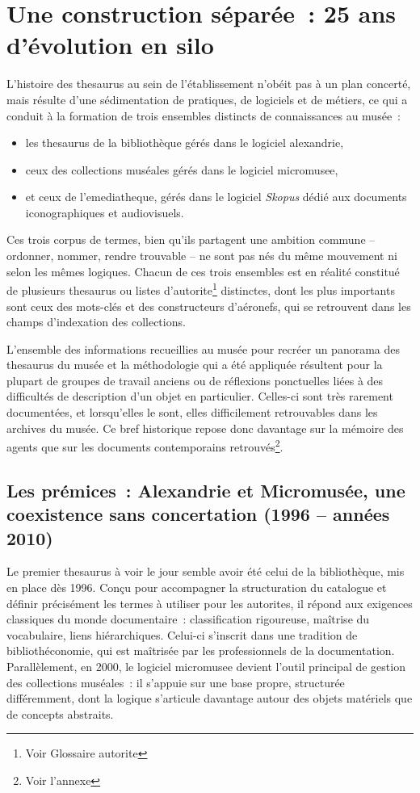 \section{\label{II-A-1}Une construction séparée~: 25 ans d'évolution en silo}

L'histoire des \gls{thesaurus} au sein de l'établissement n'obéit pas à un plan concerté, mais résulte d'une sédimentation de pratiques, de logiciels et de métiers, ce qui a conduit à la formation de trois ensembles distincts de connaissances au musée~: 
\begin{itemize}
	\item les \gls{thesaurus} de la bibliothèque gérés dans le logiciel \gls{alexandrie},
	\item ceux des collections muséales gérés dans le logiciel \gls{micromusee},
	\item et ceux de l'\gls{emediatheque}, gérés dans le logiciel \textit{Skopus} dédié aux documents iconographiques et audiovisuels.
\end{itemize}
Ces trois corpus de termes, bien qu'ils partagent une ambition commune – ordonner, nommer, rendre trouvable – ne sont pas nés du même mouvement ni selon les mêmes logiques. Chacun de ces trois ensembles est en réalité constitué de plusieurs \gls{thesaurus} ou listes d'\gls{autorite}\footnote{Voir Glossaire \gls{autorite}} distinctes, dont les plus importants sont ceux des mots-clés et des constructeurs d'aéronefs, qui se retrouvent dans les champs d'indexation des collections.

L'ensemble des informations recueillies au musée pour recréer un panorama des \gls{thesaurus} du musée et la méthodologie qui a été appliquée résultent pour la plupart de groupes de travail anciens ou de réflexions ponctuelles liées à des difficultés de description d'un objet en particulier. Celles-ci sont très rarement documentées, et lorsqu'elles le sont, elles difficilement retrouvables dans les archives du musée. Ce bref historique repose donc davantage sur la mémoire des agents que sur les documents contemporains retrouvés\footnote{Voir l'annexe }.

\subsection{Les prémices~: Alexandrie et Micromusée, une coexistence sans concertation (1996 – années 2010)}

Le premier \gls{thesaurus} à voir le jour semble avoir été celui de la bibliothèque, mis en place dès 1996. Conçu pour accompagner la structuration du catalogue et définir précisément les termes à utiliser pour les \glspl{autorite}, il répond aux exigences classiques du monde documentaire~: classification rigoureuse, maîtrise du vocabulaire, liens hiérarchiques. Celui-ci s'inscrit dans une tradition de bibliothéconomie, qui est maîtrisée par les professionnels de la documentation. Parallèlement, en 2000, le logiciel \gls{micromusee} devient l'outil principal de gestion des collections muséales~: il s'appuie sur une base propre, structurée différemment, dont la logique s'articule davantage autour des objets matériels que de concepts abstraits.

